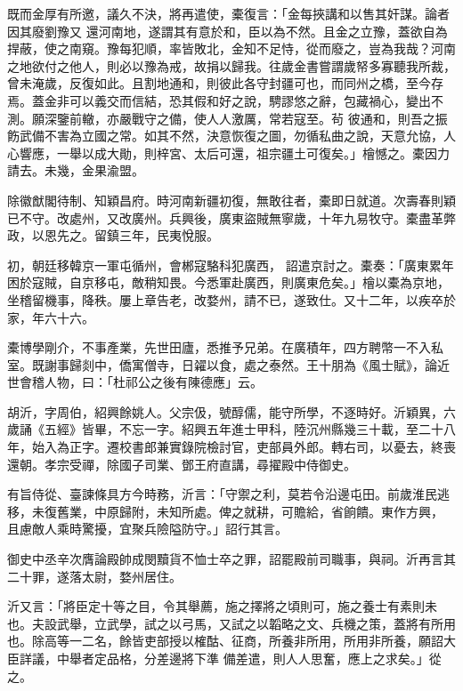 \begin{pinyinscope}
 既而金厚有所邀，議久不決，將再遣使，橐復言：「金每挾講和以售其奸謀。論者因其廢劉豫又
 還河南地，遂謂其有意於和，臣以為不然。且金之立豫，蓋欲自為捍蔽，使之南窺。豫每犯順，率皆敗北，金知不足恃，從而廢之，豈為我哉？河南之地欲付之他人，則必以豫為戒，故捐以歸我。往歲金書嘗謂歲帑多寡聽我所裁，曾未淹歲，反復如此。且割地通和，則彼此各守封疆可也，而同州之橋，至今存焉。蓋金非可以義交而信結，恐其假和好之說，騁謬悠之辭，包藏禍心，變出不測。願深鑒前轍，亦嚴戰守之備，使人人激厲，常若寇至。茍
 彼通和，則吾之振飭武備不害為立國之常。如其不然，決意恢復之圖，勿循私曲之說，天意允協，人心響應，一舉以成大勛，則梓宮、太后可還，祖宗疆土可復矣。」檜憾之。橐因力請去。未幾，金果渝盟。



 除徽猷閣待制、知穎昌府。時河南新疆初復，無敢往者，橐即日就道。次壽春則穎已不守。改處州，又改廣州。兵興後，廣東盜賊無寧歲，十年九易牧守。橐盡革弊政，以恩先之。留鎮三年，民夷悅服。



 初，朝廷移韓京一軍屯循州，會郴寇駱科犯廣西，
 詔遣京討之。橐奏：「廣東累年困於寇賊，自京移屯，敵稍知畏。今悉軍赴廣西，則廣東危矣。」檜以橐為京地，坐稽留機事，降秩。屢上章告老，改婺州，請不已，遂致仕。又十二年，以疾卒於家，年六十六。



 橐博學剛介，不事產業，先世田廬，悉推予兄弟。在廣積年，四方聘幣一不入私室。既謝事歸剡中，僑寓僧寺，日糴以食，處之泰然。王十朋為《風士賦》，論近世會稽人物，曰：「杜祁公之後有陳德應」云。



 胡沂，字周伯，紹興餘姚人。父宗伋，號醇儒，能守所學，不逐時好。沂穎異，六歲誦《五經》皆畢，不忘一字。紹興五年進士甲科，陸沉州縣幾三十載，至二十八年，始入為正字。遷校書郎兼實錄院檢討官，吏部員外郎。轉右司，以憂去，終喪還朝。孝宗受禪，除國子司業、鄧王府直講，尋擢殿中侍御史。



 有旨侍從、臺諫條具方今時務，沂言：「守禦之利，莫若令沿邊屯田。前歲淮民逃移，未復舊業，中原歸附，未知所處。俾之就耕，可贍給，省餉饋。東作方興，
 且慮敵人乘時驚擾，宜聚兵險隘防守。」詔行其言。



 御史中丞辛次膺論殿帥成閔黷貨不恤士卒之罪，詔罷殿前司職事，與祠。沂再言其二十罪，遂落太尉，婺州居住。



 沂又言：「將臣定十等之目，令其舉薦，施之擇將之頃則可，施之養士有素則未也。夫設武舉，立武學，試之以弓馬，又試之以韜略之文、兵機之策，蓋將有所用也。除高等一二名，餘皆吏部授以榷酤、征商，所養非所用，所用非所養，願詔大臣詳議，中舉者定品格，分差邊將下準
 備差遣，則人人思奮，應上之求矣。」從之。




\end{pinyinscope}

